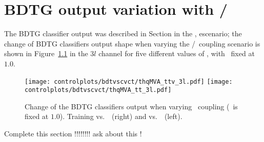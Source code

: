\chapter{BDTG output variation with \CV/\Ct }\label{sec:bdtvscvct}

The BDTG classifier output was described in Section \label{secc:signal_disc} in the , escenario; the change of BDTG classifiers output shape when varying the \CV/\Ct\ coupling scenario is shown in Figure~\ref{fig:bdtvscvct} in the $3l$ channel for five different values of \Ct, with \CV\ fixed at $1.0$.
\begin{figure} [!h]
  \centering
  \texttt{[image: controlplots/bdtvscvct/thqMVA\_ttv\_3l.pdf]}
  \texttt{[image: controlplots/bdtvscvct/thqMVA\_tt\_3l.pdf]} \\
  \caption[BDTG output variation with \CV/\Ct]{Change of the BDTG classifiers output when varying \Ct\ coupling (\CV\ is fixed at $1.0$). Training vs.\ \ttV\ (right) and vs.\ \ttbar\ (left).}
  \label{fig:bdtvscvct}
\end{figure}



Complete this  section !!!!!!!! ask about this !
